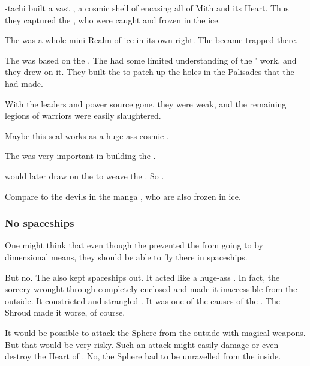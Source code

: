 \Sethicus-tachi built a vast \CrystalSphere, a cosmic shell of  encasing all of Mith and its Heart. 
Thus they captured the \banelords, who were caught and frozen in the ice. 

The \CrystalSphere{} was a whole mini-Realm of ice in its own right. 
The \banelords{} became trapped there. 

The \CrystalSphere was based on the . 
The \ophidians had some limited understanding of the \voyagers' work, and they drew on it.
They built the \CrystalSphere to patch up the holes in the Palisades that the \banes had made.

With the \pps{\banes}{} leaders and power source gone, they were weak, and the remaining legions of \bane{} warriors were easily slaughtered. 

Maybe this seal works as a huge-ass cosmic . 

The \xs{}  was very important in building the \CrystalSphere. 

\Daggerrain{} would later draw on the \CrystalSphere{} to weave the . 
So . 

Compare to the devils in the manga \cite{NagaiGo:Devilman}, who are also frozen in ice. 





\subsubsection{No spaceships}
One might think that even though the \CrystalSphere{} prevented the \banelords{} from going to \Miith{} by dimensional means, they should be able to fly there in spaceships. 

But no. 
The \CrystalSphere{} also kept spaceships out. 
It acted like a huge-ass . 
In fact, the sorcery wrought through \NaathKurRamalech{} completely enclosed \Miith{} and made it inaccessible from the outside. 
It constricted and strangled \Miith{}. 
It was one of the causes of the . 
The Shroud made it worse, of course. 

It would be possible to attack the Sphere from the outside with magical weapons. 
But that would be very risky. 
Such an attack might easily damage or even destroy the Heart of \Miith. 
No, the Sphere had to be unravelled from the inside. 










